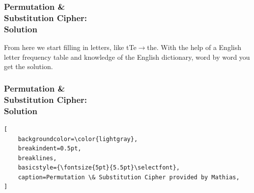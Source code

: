\documentclass{uva-inf-presentation}
\begin{document}
\begin{frame}
\frametitle{Permutation \&\\ Substitution Cipher:\\ Solution}
From here we start filling in letters, like tTe$\rightarrow$the. With the help
of a English letter frequency table and knowledge of the English dictionary,
word by word you get the solution.
\end{frame}

\begin{frame}[containsverbatim]
\frametitle{Permutation \&\\ Substitution Cipher:\\ Solution}
\vspace{-20pt}
\begin{lstlisting}[
    backgroundcolor=\color{lightgray},
    breakindent=0.5pt,
    breaklines,
    basicstyle={\fontsize{5pt}{5.5pt}\selectfont},
    caption=Permutation \& Substitution Cipher provided by Mathias,
]

\end{lstlisting}
\end{frame}
\end{document}
